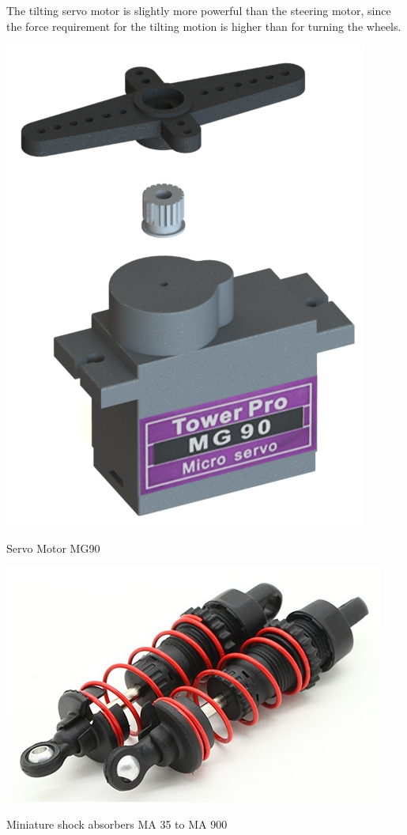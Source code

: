 \begin{itemize}
\begin{itemize}
	The tilting servo motor is slightly more powerful than the steering motor, since the force requirement for the tilting motion is higher than for turning the wheels.
	
	\begin{marginfigure}[-13cm]
		\includegraphics[width=0.75\linewidth]{figs/04/servo}
		\caption{Servo Motor MG90}
	\end{marginfigure}
	
	\begin{marginfigure}[-4cm]
		\includegraphics[width=0.85\linewidth]{figs/04/55758}
		\caption{Miniature shock absorbers MA 35 to MA 900}
	\end{marginfigure}
	

\end{itemize}
\end{itemize}
